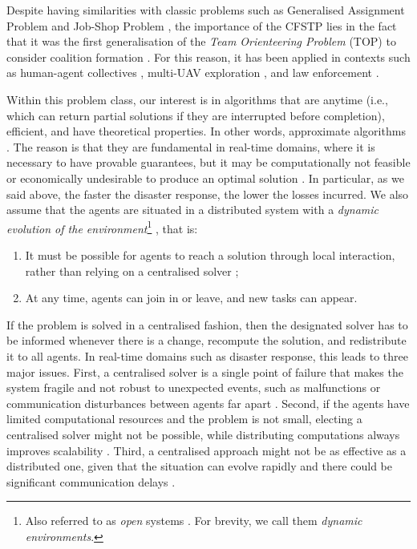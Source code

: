 Despite having similarities with classic problems such as Generalised Assignment Problem
\cite{ross1975} and Job-Shop Problem \cite{brucker2007}, the importance of the CFSTP lies
in the fact that it was the first generalisation of the \emph{Team Orienteering Problem}
(TOP) to consider coalition formation \cite[Section $4.2$]{ramchurn2010cfstp}. For this
reason, it has been applied in contexts such as human-agent collectives
\cite{ramchurn2015a}, multi-UAV exploration \cite{baker2016}, and law enforcement
\cite{nelke2020,tkach2021}.

Within this problem class, our interest is in algorithms that are anytime (i.e., which can
return partial solutions if they are interrupted before completion), efficient, and have
theoretical properties. In other words, approximate algorithms \cite{papadimitriou1993}.
The reason is that they are fundamental in real-time domains, where it is necessary to
have provable guarantees, but it may be computationally not feasible or economically
undesirable to produce an optimal solution \cite{zilberstein1996,calvaresi2021}. In
particular, as we said above, the faster the disaster response, the lower the losses
incurred. We also assume that the agents are situated in a distributed system
\cite{tanenbaum2017} with a \emph{dynamic evolution of the environment}\footnote{Also
referred to as \emph{open} systems \cite{hewitt1990}. For brevity, we call them
\emph{dynamic environments}.} \cite{fioretto2018survey}, that is:
\begin{enumerate}
    \item It must be possible for agents to reach a solution through local interaction,
        rather than relying on a centralised solver \cite{ramchurn2010fms};
    \item At any time, agents can join in or leave, and new tasks can appear.
\end{enumerate}
If the problem is solved in a centralised fashion, then the designated solver has to be
informed whenever there is a change, recompute the solution, and redistribute it to all
agents.
In real-time domains such as disaster response, this leads to three major issues. First, a
centralised solver is a single point of failure that makes the system fragile and not
robust to unexpected events, such as malfunctions or communication disturbances between
agents far apart \cite{petcu2007thesis}. Second, if the agents have limited computational
resources and the problem is not small, electing a centralised solver might not be
possible, while distributing computations always improves scalability
\cite{tanenbaum2017}. Third, a centralised approach might not be as effective as a
distributed one, given that the situation can evolve rapidly and there could be
significant communication delays \cite{mailler2018}.

